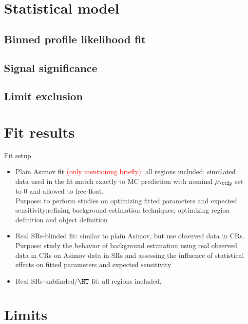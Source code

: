 \documentclass[../thesis.tex]{subfiles}
\begin{document}
\vspace{-1\baselineskip}
\section{Statistical model}
\label{sec:stat}
\subsection{Binned profile likelihood fit}

\subsection{Signal significance}

\subsection{Limit exclusion}


\section{Fit results}
\label{sec:results}

Fit setup
\begin{itemize}
\item Plain Asimov fit \textcolor{red}{(only mentioning briefly)}: all regions included; simulated data used in the fit match exactly to MC prediction with nominal $\mu_{\ttZp}$ set to 0 and allowed to free-float.\\
Purpose: to perform studies on optimizing fitted parameters and expected sensitivity;refining background estimation techniques; optimizing region definition and object definition
\item Real SRs-blinded fit: similar to plain Asimov, but use observed data in CRs. \\
Purpose: study the behavior of background estimation using real observed data in CRs on Asimov data in SRs and assessing the influence of statistical effects on fitted parameters and expected sensitivity
\item Real SRs-unblinded/$\HT$ fit: all regions included, 
\end{itemize}



\section{Limits}
\label{sec:limits}
\end{document}
